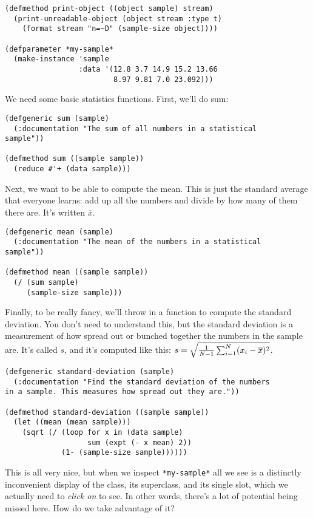\begin{verbatim}
(defmethod print-object ((object sample) stream)
  (print-unreadable-object (object stream :type t)
    (format stream "n=~D" (sample-size object))))

(defparameter *my-sample*
  (make-instance 'sample
                 :data '(12.8 3.7 14.9 15.2 13.66
                         8.97 9.81 7.0 23.092)))
\end{verbatim}

We need some basic statistics functions. First, we'll do sum:

\begin{verbatim}
(defgeneric sum (sample)
  (:documentation "The sum of all numbers in a statistical
sample"))

(defmethod sum ((sample sample))
  (reduce #'+ (data sample)))
\end{verbatim}

Next, we want to be able to compute the mean. This is just the standard
average that everyone learns: add up all the numbers and divide by how
many of them there are. It's written $\overline {x}$.

\begin{verbatim}
(defgeneric mean (sample)
  (:documentation "The mean of the numbers in a statistical
sample"))

(defmethod mean ((sample sample))
  (/ (sum sample)
     (sample-size sample)))
\end{verbatim}

Finally, to be really fancy, we'll throw in a function to compute the
standard deviation. You don't need to understand this, but the standard
deviation is a measurement of how spread out or bunched together the
numbers in the sample are. It's called $s$, and it's computed like
this: $s = \sqrt{{1 \over N-1} \sum_{i=1}^N (x_i - \overline {x})^2}$.

\begin{verbatim}
(defgeneric standard-deviation (sample)
  (:documentation "Find the standard deviation of the numbers
in a sample. This measures how spread out they are."))

(defmethod standard-deviation ((sample sample))
  (let ((mean (mean sample)))
    (sqrt (/ (loop for x in (data sample)
                   sum (expt (- x mean) 2))
             (1- (sample-size sample))))))
\end{verbatim}

This is all very nice, but when we inspect \texttt{*my-sample*} all we see
is a distinctly inconvenient display of the class, its superclass, and
its single slot, which we actually need to \emph{click on} to see. In
other words, there's a lot of potential being missed here. How do we
take advantage of it?

